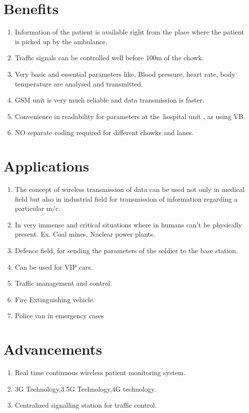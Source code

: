 \documentclass[12pt,a4paper,oneside,openright]{report}
\begin{document}
\section{Benefits}
\begin{enumerate}
 \item Information of the patient is available right from the place where the patient is picked up by the ambulance.
\item Traffic signals can be controlled well before 100m of the chowk.
\item Very basic and essential parameters like, Blood pressure, heart rate, body temperature are analysed and transmitted.
\item GSM unit is very much reliable and data transmission is faster.
\item Convenience in readability for parameters at the hospital unit , as using VB.
\item NO separate coding required for different chowks and lanes.
\end{enumerate}

\section{Applications}
\begin{enumerate}
 \item The concept of wireless transmission of data can be used not only in medical field but also in industrial field for transmission of information regarding a particular m/c.
\item In very immense and critical situations where in humans can’t be physically present. Ex.    Coal mines, Nuclear power plants.
\item Defence field, for sending the parameters of the soldier to the base station. 
\item Can be used for VIP cars. 
\item Traffic management and control.
\item Fire Extinguishing vehicle. 
\item Police van in emergency cases
\end{enumerate}

\section{Advancements}
\begin{enumerate}
 \item Real time continuous wireless patient monitoring system. 
\item 3G Technology,3.5G Technology,4G technology. 
\item Centralized signalling station for traffic control.
\end{enumerate}
\end{document}
